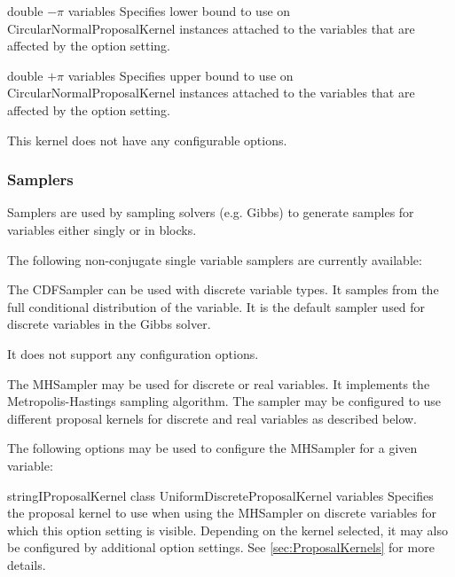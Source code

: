 
{double}
{$-\pi$}
{variables}
{Specifies lower bound to use on CircularNormalProposalKernel instances attached to the variables that are affected by the option setting.}


{double}
{$+\pi$}
{variables}
{Specifies upper bound to use on CircularNormalProposalKernel instances attached to the variables that are affected by the option setting.}

\label{sec:UniformDiscreteProposalKernel}

This kernel does not have any configurable options.

\clearpage
\subsubsection{Samplers}
\label{sec:Samplers}

Samplers are used by sampling solvers (e.g. Gibbs) to generate samples for variables either singly or in blocks.

The following non-conjugate single variable samplers are currently available:

\label{sec:CDFSampler}

The CDFSampler can be used with discrete variable types. It samples from the full conditional distribution of the variable. It is the default sampler used for discrete variables in the Gibbs solver.

It does not support any configuration options.

\label{sec:MHSampler}

The MHSampler may be used for discrete or real variables. It implements the Metropolis-Hastings sampling algorithm. The sampler may be configured to use different proposal kernels for discrete and real variables as described below.

The following options may be used to configure the MHSampler for a given variable:


{\ifmatlab string\fi \ifjava IProposalKernel class\fi}
{UniformDiscreteProposalKernel}
{variables}
{Specifies the proposal kernel to use when using the MHSampler on discrete variables for which this option setting is visible. Depending on the kernel selected, it may also be configured by additional option settings. See \autoref{sec:ProposalKernels} for more details.}

